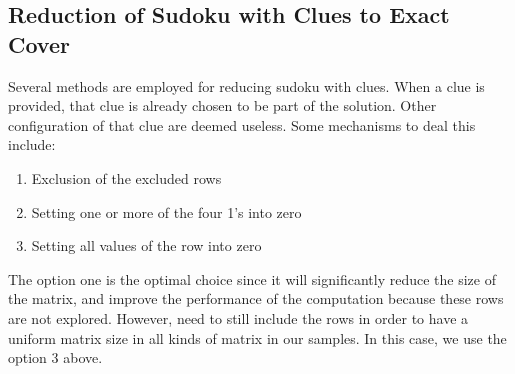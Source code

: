 \documentclass[a4paper,oneside,11pt]{report}
\begin{document}
\subsection{Reduction of Sudoku with Clues to Exact Cover}
Several methods are employed for reducing sudoku with clues. When a clue is provided, that clue is already chosen to be part of the solution. Other configuration of that clue are deemed useless. Some mechanisms to deal this include:
\begin{enumerate}
\item Exclusion of the excluded rows
\vspace{-0.3cm}
\item Setting one or more of the four 1’s into zero
\vspace{-0.3cm}
\item Setting all values of the row into zero
\end{enumerate}

The option one is the optimal choice since it will significantly reduce the size of the matrix, and improve the performance of the computation because these rows are not explored. However,  need to still include the rows in order to have a uniform matrix size in all kinds of matrix in our samples. In this case, we use the option 3 above.\\
\end{document}
